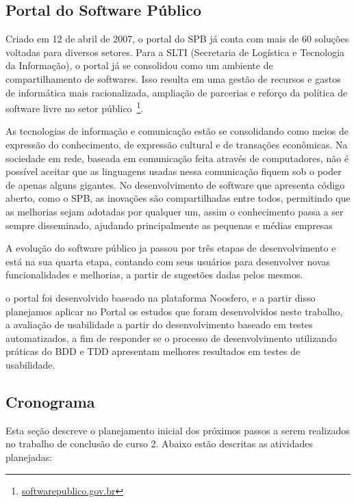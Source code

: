 \subsection{Portal do Software Público}

Criado em 12 de abril de 2007, o portal do SPB já conta com mais de 60 soluções voltadas para diversos setores. Para a SLTI (Secretaria de Logística e Tecnologia da Informação), o portal já se consolidou como um ambiente de compartilhamento de softwares. Isso resulta em uma gestão de recursos e gastos de informática mais racionalizada, ampliação de parcerias e reforço da política de software livre no setor público~\footnote{\url{softwarepublico.gov.br}}. 

As tecnologias de informação e comunicação estão se consolidando como meios de expressão do conhecimento, de expressão cultural e de transações econômicas. Na sociedade em rede, baseada em comunicação feita através de computadores, não é possível aceitar que as linguagens usadas nessa comunicação fiquem sob o poder de apenas alguns gigantes. No desenvolvimento de software que apresenta código aberto, como o SPB, as inovações são compartilhadas entre todos, permitindo que as melhorias sejam adotadas por qualquer um, assim o conhecimento passa a ser sempre disseminado, ajudando principalmente as pequenas e médias empresas

A evolução do software público ja passou por três etapas de desenvolvimento e está na sua quarta etapa, contando com seus usuários para desenvolver novas funcionalidades e melhorias, a partir de sugestões dadas pelos mesmos.

o portal foi desenvolvido baseado na plataforma Noosfero, e a partir disso planejamos aplicar no Portal os estudos que foram desenvolvidos neste trabalho, a avaliação de usabilidade a partir do desenvolvimento baseado em testes automatizados, a fim de responder se o processo de desenvolvimento utilizando práticas do BDD e TDD apresentam melhores resultados em testes de usabilidade.

\subsection{Cronograma}

Esta seção descreve o planejamento inicial dos próximos passos a serem realizados no trabalho de conclusão de curso 2. Abaixo estão descritas as atividades planejadas:

